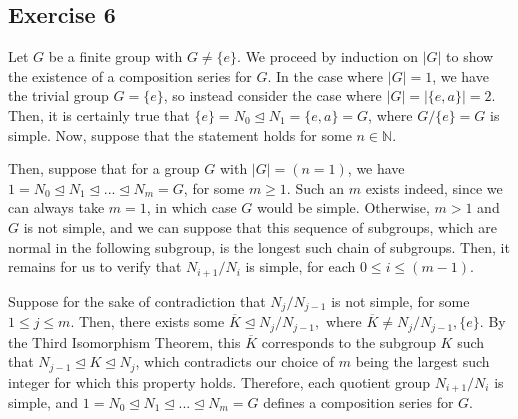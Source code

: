\subsection*{Exercise 6}
Let $G$ be a finite group with $G \not= \{e\}$. We proceed by induction on $|G|$ to show the existence of a composition series for $G$. In the case where $|G| = 1$, we have the trivial group $G = \{e\}$, so instead consider the case where $|G| = |\{e,a\}| = 2$. Then, it is certainly true that $\{e\} = N_0 \trianglelefteq N_1 = \{e,a\} = G$, where $G/\{e\} = G$ is simple. Now, suppose that the statement holds for some $n \in \mathbb{N}$. 

Then, suppose that for a group $G$ with $|G| = (n=1)$, we have $1 = N_0 \trianglelefteq N_1 \trianglelefteq ... \trianglelefteq N_m = G$, for some $m \ge 1$. Such an $m$ exists indeed, since we can always take $m = 1$, in which case $G$ would be simple. Otherwise, $m > 1$ and $G$ is not simple, and we can suppose that this sequence of subgroups, which are normal in the following subgroup, is the longest such chain of subgroups. Then, it remains for us to verify that $N_{i+1}/N_i$ is simple, for each $0 \le i \le (m-1)$. 

Suppose for the sake of contradiction that $N_j/N_{j-1}$ is not simple, for some $1 \le j \le m$. Then, there exists some $\overline{K} \trianglelefteq N_j/N_{j-1},$ where $\overline{K} \not = N_j/N_{j-1},\{e\}$. By the Third Isomorphism Theorem, this $\overline{K}$ corresponds to the subgroup $K$ such that $N_{j-1} \trianglelefteq K \trianglelefteq N_j$, which contradicts our choice of $m$ being the largest such integer for which this property holds. Therefore, each quotient group $N_{i+1}/N_i$ is simple, and $1 = N_0 \trianglelefteq N_1 \trianglelefteq ... \trianglelefteq N_m = G$ defines a composition series for $G$.